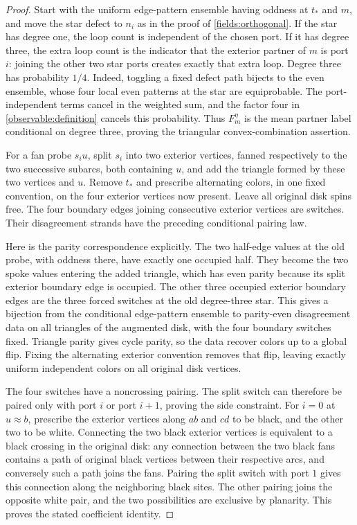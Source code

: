\begin{proof}
Start with the uniform edge-pattern ensemble having oddness at $t_*$ and
$m$, and move the star defect to $n_i$ as in the proof of
\eqref{fields:orthogonal}. If the star has degree one, the loop count is
independent of the chosen port. If it has degree three, the extra loop
count is the indicator that the exterior partner of $m$ is port $i$:
joining the other two star ports creates exactly that extra loop.
Degree three has probability $1/4$. Indeed, toggling a fixed defect path
bijects to the even ensemble, whose four local even patterns at the star
are equiprobable. The port-independent terms cancel in the weighted
sum, and the factor four in \eqref{observable:definition} cancels this
probability. Thus $F_m^\eta$ is the mean partner label conditional on
degree three, proving the triangular convex-combination assertion.

For a fan probe $s_i u$, split $s_i$ into two exterior vertices, fanned
respectively to the two successive subarcs, both containing $u$, and add
the triangle formed by these two vertices and $u$. Remove $t_*$ and
prescribe alternating colors, in one fixed convention, on the four
exterior vertices now present. Leave all original disk spins free. The
four boundary edges joining consecutive exterior vertices are switches.
Their disagreement strands have the preceding conditional pairing law.

Here is the parity correspondence explicitly. The two half-edge values
at the old probe, with oddness there, have exactly one occupied half.
They become the two spoke values entering the added triangle, which has
even parity because its split exterior boundary edge is occupied. The
other three occupied exterior boundary edges are the three forced
switches at the old degree-three star. This gives a bijection from the
conditional edge-pattern ensemble to parity-even disagreement data on
all triangles of the augmented disk, with the four boundary switches
fixed. Triangle parity gives cycle parity, so the data recover colors up
to a global flip. Fixing the alternating exterior convention removes
that flip, leaving exactly uniform independent colors on all original
disk vertices.

The four switches have a noncrossing pairing. The split switch can
therefore be paired only with port $i$ or port $i+1$, proving the side
constraint. For $i=0$ at $u\approx b$, prescribe the exterior vertices
along $ab$ and $cd$ to be black, and the other two to be white. Connecting
the two black exterior vertices is equivalent to a black crossing in the
original disk: any connection between the two black fans contains a path
of original black vertices between their respective arcs, and conversely
such a path joins the fans. Pairing the split switch with port $1$ gives
this connection along the neighboring black sites. The other pairing
joins the opposite white pair, and the two possibilities are exclusive
by planarity. This proves the stated coefficient identity.
\end{proof}

